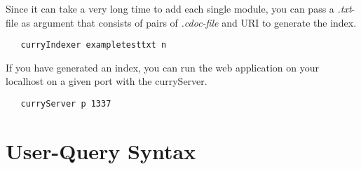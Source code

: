 \documentclass[%
	pdftex,%
	a4paper,%
	oneside,%
	chapterprefix,%
	headsepline,%
	12pt%
]{scrbook}
\begin{document}
Since it can take a very long time to add each single module, you can
pass a \emph{.txt}-file as argument that consists of pairs of \emph{.cdoc-file} and
URI to generate the index.

\begin{tabbing}\tt
~~curryIndexer~exampletesttxt~n
\end{tabbing}

If you have generated an index, you can run the web application on your
localhost on a given port with the curryServer.

\begin{tabbing}\tt
~~curryServer~p~1337
\end{tabbing}

\chapter{User-Query Syntax}\label{a:syntax}



% 
\end{document}
